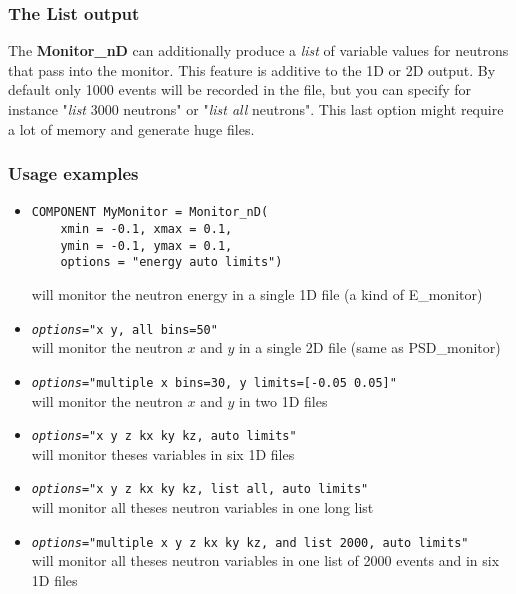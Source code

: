 \subsubsection{The List output}

The {\bf Monitor\_nD} can additionally produce a {\it list} of variable
values for neutrons that pass into the monitor. This feature is additive
to the 1D or 2D output. By default only 1000 events will be recorded in
the file, but you can specify for instance "{\it list} 3000 neutrons" or
"{\it list all} neutrons". This last option might require a lot of
memory and generate huge files.

\subsubsection{Usage examples}

\begin{itemize}
\item{
\begin{verbatim}
COMPONENT MyMonitor = Monitor_nD( 
    xmin = -0.1, xmax = 0.1, 
    ymin = -0.1, ymax = 0.1, 
    options = "energy auto limits")
\end{verbatim}
will monitor the neutron energy in a single 1D file (a kind of E\_monitor)}
\item{\texttt{{\it options}="x y, all bins=50"} \\
will monitor the neutron $x$ and $y$ in a single 2D file (same as PSD\_monitor)}

\item{\texttt{{\it options}="multiple x bins=30, y limits=[-0.05 0.05]"} \\
will monitor the neutron $x$ and $y$ in two 1D files}
\item{\texttt{{\it options}="x y z kx ky kz,  auto limits"} \\
will monitor theses variables in six 1D files}
\item{\texttt{{\it options}="x y z kx ky kz, list all, auto limits"} \\
will monitor all theses neutron variables in one long list}
\item{\texttt{{\it options}="multiple x y z kx ky kz, and list 2000,  auto limits"} \\
    will monitor all theses neutron variables in one list of 2000 events
    and in six 1D files}
\end{itemize}
